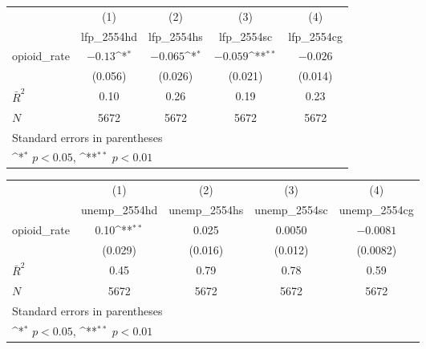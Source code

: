 {
\def\sym#1{\ifmmode^{#1}\else\(^{#1}\)\fi}
\begin{tabular}{l*{4}{c}}
\hline\hline
            &\multicolumn{1}{c}{(1)}&\multicolumn{1}{c}{(2)}&\multicolumn{1}{c}{(3)}&\multicolumn{1}{c}{(4)}\\
            &\multicolumn{1}{c}{lfp\_2554hd}&\multicolumn{1}{c}{lfp\_2554hs}&\multicolumn{1}{c}{lfp\_2554sc}&\multicolumn{1}{c}{lfp\_2554cg}\\
\hline
opioid\_rate &       $-0.13$\sym{*} &      $-0.065$\sym{*} &      $-0.059$\sym{**}&      $-0.026$        \\
            &     (0.056)        &     (0.026)        &     (0.021)        &     (0.014)        \\
\hline
$\bar{R}^2$ &        0.10        &        0.26        &        0.19        &        0.23        \\
$N$         &        5672        &        5672        &        5672        &        5672        \\
\hline\hline
\multicolumn{5}{l}{\footnotesize Standard errors in parentheses}\\
\multicolumn{5}{l}{\footnotesize \sym{*} \(p<0.05\), \sym{**} \(p<0.01\)}\\
\end{tabular}
}
{
\def\sym#1{\ifmmode^{#1}\else\(^{#1}\)\fi}
\begin{tabular}{l*{4}{c}}
\hline\hline
            &\multicolumn{1}{c}{(1)}&\multicolumn{1}{c}{(2)}&\multicolumn{1}{c}{(3)}&\multicolumn{1}{c}{(4)}\\
            &\multicolumn{1}{c}{unemp\_2554hd}&\multicolumn{1}{c}{unemp\_2554hs}&\multicolumn{1}{c}{unemp\_2554sc}&\multicolumn{1}{c}{unemp\_2554cg}\\
\hline
opioid\_rate &        0.10\sym{**}&       0.025        &      0.0050        &     $-0.0081$        \\
            &     (0.029)        &     (0.016)        &     (0.012)        &    (0.0082)        \\
\hline
$\bar{R}^2$ &        0.45        &        0.79        &        0.78        &        0.59        \\
$N$         &        5672        &        5672        &        5672        &        5672        \\
\hline\hline
\multicolumn{5}{l}{\footnotesize Standard errors in parentheses}\\
\multicolumn{5}{l}{\footnotesize \sym{*} \(p<0.05\), \sym{**} \(p<0.01\)}\\
\end{tabular}
}
